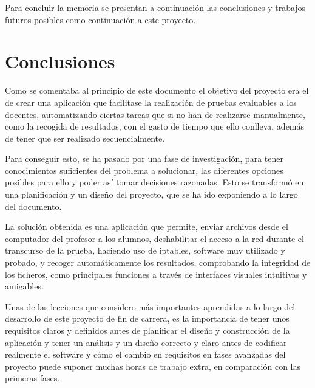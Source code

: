 

\label{chap:futuro}

Para concluir la memoria se presentan a continuación las conclusiones y trabajos futuros posibles como continuación a este proyecto.

\chaptertoc

\section{Conclusiones}
\label{sec:futuro:conclusiones}

Como se comentaba al principio de este documento el objetivo del proyecto era el de crear una aplicación que facilitase la realización de pruebas evaluables a los docentes, automatizando ciertas tareas que si no han de realizarse manualmente, como la recogida de resultados, con el gasto de tiempo que ello conlleva, además de tener que ser realizado secuencialmente.
\newline

Para conseguir esto, se ha pasado por una fase de investigación, para tener conocimientos suficientes del problema a solucionar, las diferentes opciones posibles para ello y poder así tomar decisiones razonadas. Esto se transformó en una planificación y un diseño del proyecto, que se ha ido exponiendo a lo largo del documento.
\newline

La solución obtenida es una aplicación que permite, enviar archivos desde el computador del profesor a los alumnos, deshabilitar el acceso a la red durante el transcurso de la prueba, haciendo uso de iptables, software muy utilizado y probado, y recoger automáticamente los resultados, comprobando la integridad de los ficheros, como principales funciones a través de interfaces visuales intuitivas y amigables.
\newline


Unas de las lecciones que considero más importantes aprendidas a lo largo del desarrollo de este proyecto de fin de carrera, es la importancia de tener unos requisitos claros y definidos antes de planificar el diseño y construcción de la aplicación y tener un análisis y un diseño correcto y claro antes de codificar realmente el software y cómo el cambio en requisitos en fases avanzadas del proyecto puede suponer muchas horas de trabajo extra, en comparación con las primeras fases.
\newline

